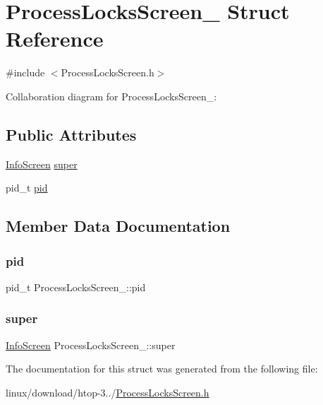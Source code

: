 \hypertarget{structProcessLocksScreen__}{}\section{Process\+Locks\+Screen\+\_\+ Struct Reference}
\label{structProcessLocksScreen__}


{\ttfamily \#include $<$Process\+Locks\+Screen.\+h$>$}



Collaboration diagram for Process\+Locks\+Screen\+\_\+\+:
\subsection*{Public Attributes}
\begin{DoxyCompactItemize}
\item 
\hyperlink{InfoScreen_8h_a97139d799c65bdbb53b127e2717369c8}{Info\+Screen} \hyperlink{structProcessLocksScreen___a1ec9ded175fb1ca024f28e4c2b9b4879}{super}
\item 
pid\+\_\+t \hyperlink{structProcessLocksScreen___ae91d18029f0ccfa8fde8ffcb0d15b4ce}{pid}
\end{DoxyCompactItemize}


\subsection{Member Data Documentation}
\mbox{\label{structProcessLocksScreen___ae91d18029f0ccfa8fde8ffcb0d15b4ce}} 
\subsubsection{\texorpdfstring{pid}{pid}}
{\footnotesize\ttfamily pid\+\_\+t Process\+Locks\+Screen\+\_\+\+::pid}

\mbox{\label{structProcessLocksScreen___a1ec9ded175fb1ca024f28e4c2b9b4879}} 
\subsubsection{\texorpdfstring{super}{super}}
{\footnotesize\ttfamily \hyperlink{InfoScreen_8h_a97139d799c65bdbb53b127e2717369c8}{Info\+Screen} Process\+Locks\+Screen\+\_\+\+::super}



The documentation for this struct was generated from the following file\+:\begin{DoxyCompactItemize}
\item 
linux/download/htop-\/3../\hyperlink{ProcessLocksScreen_8h}{Process\+Locks\+Screen.\+h}\end{DoxyCompactItemize}
